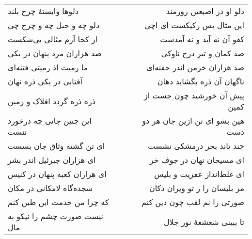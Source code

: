 \begin{center}
\begin{longtable}{l p{0.5cm} r}
دلوها وابستهٔ چرخ بلند
&&
دلو او در اصبعین زورمند
\\
دلو چه و حبل چه و چرخ چی
&&
این مثال بس رکیکست ای اچی
\\
از کجا آرم مثالی بی‌شکست
&&
کفو آن نه آید و نه آمدست
\\
صد هزاران مرد پنهان در یکی
&&
صد کمان و تیر درج ناوکی
\\
ما رمیت اذ رمیتی فتنه‌ای
&&
صد هزاران خرمن اندر حفنه‌ای
\\
آفتابی در یکی ذره نهان
&&
ناگهان آن ذره بگشاید دهان
\\
ذره ذره گردد افلاک و زمین
&&
پیش آن خورشید چون جست از کمین
\\
این چنین جانی چه درخورد تنست
&&
هین بشو ای تن ازین جان هر دو دست
\\
ای تن گشته وثاق جان بسست
&&
چند تاند بحر درمشکی نشست
\\
ای هزاران جبرئیل اندر بشر
&&
ای مسیحان نهان در جوف خر
\\
ای هزاران کعبه پنهان در کنیس
&&
ای غلط‌انداز عفریت و بلیس
\\
سجده‌گاه لامکانی در مکان
&&
مر بلیسان را ز تو ویران دکان
\\
که چرا من خدمت این طین کنم
&&
صورتی را نم لقب چون دین کنم
\\
نیست صورت چشم را نیکو به مال
&&
تا ببینی شعشعهٔ نور جلال
\\
\end{longtable}
\end{center}
